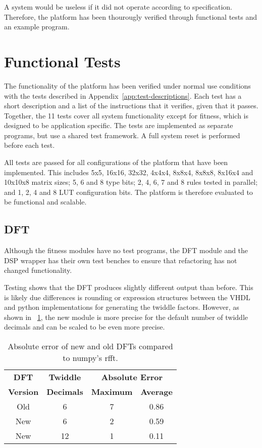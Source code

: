 A system would be useless if it did not operate according to specification.
Therefore, the platform has been thourougly verified through functional tests and an example program.


\section{Functional Tests}

The functionality of the platform has been verified under normal use conditions with the tests described in Appendix~\ref{app:test-descriptions}.
Each test has a short description and a list of the instructions that it verifies, given that it passes.
Together, the 11 tests cover all system functionality except for fitness, which is designed to be application specific.
The tests are implemented as separate programs, but use a shared test framework.
A full system reset is performed before each test.

All tests are passed for all configurations of the platform that have been implemented.
This includes 5x5, 16x16, 32x32, 4x4x4, 8x8x4, 8x8x8, 8x16x4 and 10x10x8 matrix sizes; 5, 6 and 8 type bits; 2, 4, 6, 7 and 8 rules tested in parallel; and 1, 2, 4 and 8 LUT configuration bits.
The platform is therefore evaluated to be functional and scalable.

\subsection{DFT}

Although the fitness modules have no test programs, the DFT module and the DSP wrapper has their own test benches to ensure that refactoring has not changed functionality.

Testing shows that the DFT produces slightly different output than before.
This is likely due differences is rounding or expression structures between the VHDL and python implementations for generating the twiddle factors.
However, as shown in \tablename~\ref{tab:dft-precision}, the new module is more precise for the default number of twiddle decimals and can be scaled to be even more precise.

\begin{table}[!ht]
    \renewcommand{\arraystretch}{1.4}
    \centering
    \begin{tabular}{c|c|c|c}
        \bfseries DFT & \bfseries Twiddle & \multicolumn{2}{c}{\bfseries Absolute Error} \\
        \bfseries Version & \bfseries Decimals & \bfseries Maximum & \bfseries Average \\
        \hline
        Old & 6 & 7 & 0.86 \\
        New & 6 & 2 & 0.59 \\
        New & 12 & 1 & 0.11 \\
    \end{tabular}
    \caption[DFT error]{
        Absolute error of new and old DFTs compared to numpy's rfft.
    }
    \label{tab:dft-precision}
\end{table}

